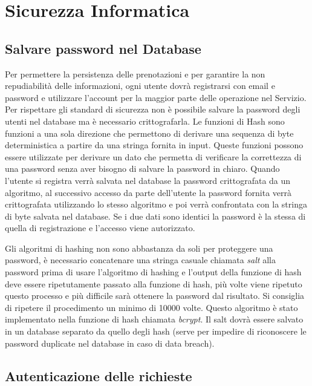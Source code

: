 \section{Sicurezza Informatica}

\subsection{Salvare password nel Database}%
\label{sub:password}

Per permettere la persistenza delle prenotazioni e per garantire la non repudiabilit\`a delle informazioni, ogni utente dovr\`a registrarsi con email e password e utilizzare l'account per la maggior parte delle operazione nel Servizio. Per rispettare gli standard di sicurezza non \`e possibile salvare la password degli utenti nel database ma \`e necessario crittografarla. Le funzioni di Hash sono funzioni a una sola direzione che permettono di derivare una sequenza di byte deterministica a partire da una stringa fornita in input. Queste funzioni possono essere utilizzate per derivare un dato che permetta di verificare la correttezza di una password senza aver bisogno di salvare la password in chiaro. Quando l'utente si registra verr\`a salvata nel database la password crittografata da un algoritmo, al successivo accesso da parte dell'utente la password fornita verr\`a crittografata utilizzando lo stesso algoritmo e poi verr\`a confrontata con la stringa di byte salvata nel database. Se i due dati sono identici la password \`e la stessa di quella di registrazione e l'accesso viene autorizzato.

Gli algoritmi di hashing non sono abbastanza da soli per proteggere una password, \`e necessario concatenare una stringa casuale chiamata \emph{salt} alla password prima di usare l'algoritmo di hashing e l'output della funzione di hash deve essere ripetutamente passato alla funzione di hash, pi\`u volte viene ripetuto questo processo e pi\`u difficile sar\`a ottenere la password dal risultato. Si consiglia di ripetere il procedimento un minimo di 10000 volte. Questo algoritmo \`e stato implementato nella funzione di hash chiamata \emph{bcrypt}. Il salt dovr\`a essere salvato in un database separato da quello degli hash (serve per impedire di riconoscere le password duplicate nel database in caso di data breach).

\subsection{Autenticazione delle richieste}%
\label{sub:authentication}

